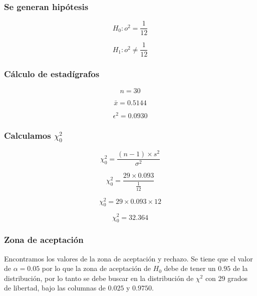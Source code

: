 \subsubsection{Se generan hipótesis}
$$H_0: o^2  = \frac{1}{12}$$

$$H_1: o^2  \not= \frac{1}{12}$$

\subsubsection{Cálculo de estadígrafos}
$$n  = 30$$

$$\bar{x} = 0.5144$$

$$\epsilon^2  = 0.0930$$

\subsubsection{Calculamos $\chi^2_0$}

$$\chi^2_0 = \frac{(n-1) \times s^2}{\sigma^2}$$

$$\chi^2_0 = \frac{29 \times 0.093}{\frac{1}{12}}$$

$$\chi^2_0 = {29 \times 0.093 \times 12}$$

$$\chi^2_0 = 32.364$$

\subsubsection{Zona de aceptación}
Encontramos los valores de la zona de aceptación y rechazo. Se tiene que el valor de $\alpha = 0.05$ por lo que la zona de aceptación de $H_0$ debe de tener un $0.95$ de la distribución, por lo tanto se debe buscar en la distribución de $\chi^2$ con 29 grados de libertad, bajo las columnas de $0.025$ y $0.9750$.

